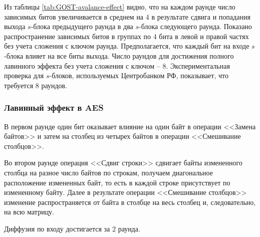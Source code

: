 Из таблицы \ref{tab:GOST-avalance-effect} видно, что на каждом раунде число зависимых битов увеличивается в среднем на 4 в результате сдвига и попадания выхода $s$-блока предыдущего раунда в два $s$-блока следующего раунда. Показано распространение зависимых битов в группах по 4 бита в левой и правой частях без учета сложения с ключом раунда. Предполагается, что каждый бит на входе $s$-блока влияет на все биты выхода. Число раундов для достижения полного лавинного эффекта без учета сложения с ключом -- 8. Экспериментальная проверка для $s$-блоков, используемых Центробанком РФ, показывает, что требуется 8 раундов.


\subsubsection{Лавинный эффект в AES}

В первом раунде один бит оказывает влияние на один байт в операции <<Замена байтов>> и затем на столбец из четырех байтов в операции <<Смешивание столбцов>>.

Во втором раунде операция <<Сдвиг строки>> сдвигает байты измененного столбца на разное число байтов по строкам, получаем диагональное расположение измененных байт, то есть в каждой строке присутствует по измененному байту. Далее в результате операции <<Смешивание столбцов>> изменение распространяется от байта в столбце на весь столбец и, следовательно, на всю матрицу.

Диффузия по входу достигается за 2 раунда.
